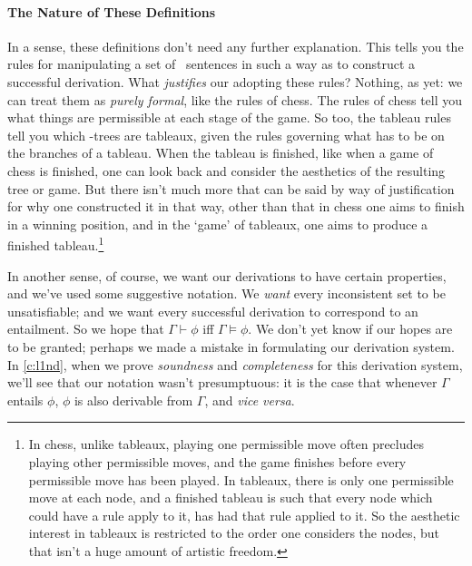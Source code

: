 \paragraph{The Nature of These Definitions} In a sense, these definitions don't need any further explanation. This tells you the rules for manipulating a set of \lone\ sentences in such a way as to construct a successful derivation. What \emph{justifies} our adopting these rules? Nothing, as yet: we can treat them as \emph{purely formal}, like the rules of chess. The rules of chess tell you what things are permissible at each stage of the game. So too, the tableau rules tell you which \lone-trees are tableaux, given the rules governing what has to be on the branches of a tableau. When the tableau is finished, like when a game of chess is finished, one can look back and consider the aesthetics of the resulting tree or game. But there isn't much more that can be said by way of justification for why one constructed it in that way, other than that in chess one aims to finish in a winning position, and in the ‘game’ of tableaux, one aims to produce a finished tableau.\footnote{In chess, unlike tableaux, playing one permissible move often precludes playing other permissible moves, and the game finishes before every permissible move has been played. In tableaux, there is only one permissible move at each node, and a finished tableau is such that every node which could have a rule apply to it, has had that rule applied to it. So the aesthetic interest in tableaux is restricted to the order one considers the nodes, but that isn't a huge amount of artistic freedom.}


In another sense, of course, we want our derivations to have certain properties, and we've used some suggestive notation. We \emph{want} every inconsistent set to be unsatisfiable; and we want every successful derivation to correspond to an entailment. So we hope that $\Gamma \vdash \phi$ iff $\Gamma \vDash \phi$. We don't yet know if our hopes are to be granted; perhaps we made a mistake in formulating our derivation system. In \autoref{c:l1nd}, when we prove \emph{soundness} and \emph{completeness} for this derivation system, we'll see that our notation wasn't presumptuous: it is the case that whenever $\Gamma$ entails $\phi$, $\phi$ is also derivable from $\Gamma$, and \emph{vice versa}.


